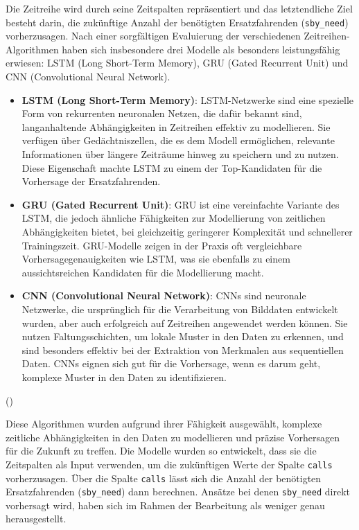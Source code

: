 \documentclass[%
pdftex,
oneside,			%
11pt,				%
parskip=half,		%
headheight = 12pt,	%
headsepline,		%
footsepline,		%
footheight = 16pt,	%
abstracton,		%
DIV=calc,		%
BCOR=8mm,		%
headinclude=false,	%
footinclude=false,	%
listof=totoc,		%
toc=bibliography,	%
]{scrreprt}	%
\begin{document}
        Die Zeitreihe wird durch seine Zeitspalten repräsentiert und das letztendliche Ziel besteht darin, die zukünftige Anzahl der benötigten Ersatzfahrenden (\texttt{sby\_need}) vorherzusagen. 
        Nach einer sorgfältigen Evaluierung der verschiedenen Zeitreihen-Algorithmen haben sich insbesondere drei Modelle als besonders leistungsfähig erwiesen: LSTM (Long Short-Term Memory), GRU (Gated Recurrent Unit) und CNN (Convolutional Neural Network).
        
        \begin{itemize}
            \item \textbf{LSTM (Long Short-Term Memory)}: LSTM-Netzwerke sind eine spezielle Form von rekurrenten neuronalen Netzen, die dafür bekannt sind, langanhaltende Abhängigkeiten in Zeitreihen effektiv zu modellieren. 
            Sie verfügen über Gedächtniszellen, die es dem Modell ermöglichen, relevante Informationen über längere Zeiträume hinweg zu speichern und zu nutzen. 
            Diese Eigenschaft machte LSTM zu einem der Top-Kandidaten für die Vorhersage der Ersatzfahrenden.
        
            \item \textbf{GRU (Gated Recurrent Unit)}: GRU ist eine vereinfachte Variante des LSTM, die jedoch ähnliche Fähigkeiten zur Modellierung von zeitlichen Abhängigkeiten bietet, bei gleichzeitig geringerer Komplexität und schnellerer Trainingszeit. 
            GRU-Modelle zeigen in der Praxis oft vergleichbare Vorhersagegenauigkeiten wie LSTM, was sie ebenfalls zu einem aussichtsreichen Kandidaten für die Modellierung macht.
        
            \item \textbf{CNN (Convolutional Neural Network)}: CNNs sind neuronale Netzwerke, die ursprünglich für die Verarbeitung von Bilddaten entwickelt wurden, aber auch erfolgreich auf Zeitreihen angewendet werden können. 
            Sie nutzen Faltungsschichten, um lokale Muster in den Daten zu erkennen, und sind besonders effektiv bei der Extraktion von Merkmalen aus sequentiellen Daten. CNNs eignen sich gut für die Vorhersage, wenn es darum geht, komplexe Muster in den Daten zu identifizieren.
        \end{itemize}     
        (\cite[Vgl.][S. 1-7]{lstm_gru_cnn}) 
        
        Diese Algorithmen wurden aufgrund ihrer Fähigkeit ausgewählt, komplexe zeitliche Abhängigkeiten in den Daten zu modellieren und präzise Vorhersagen für die Zukunft zu treffen. 
        Die Modelle wurden so entwickelt, dass sie die Zeitspalten als Input verwenden, um die zukünftigen Werte der Spalte \texttt{calls} vorherzusagen.
        Über die Spalte \texttt{calls} lässt sich die Anzahl der benötigten Ersatzfahrenden (\texttt{sby\_need}) dann berechnen.
        Ansätze bei denen \texttt{sby\_need} direkt vorhersagt wird, haben sich im Rahmen der Bearbeitung als weniger genau herausgestellt.
\end{document}
